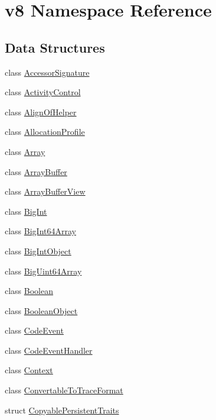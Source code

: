 \hypertarget{namespacev8}{}\section{v8 Namespace Reference}
\label{namespacev8}
\subsection*{Data Structures}
\begin{DoxyCompactItemize}
\item 
class \mbox{\hyperlink{classv8_1_1AccessorSignature}{Accessor\+Signature}}
\item 
class \mbox{\hyperlink{classv8_1_1ActivityControl}{Activity\+Control}}
\item 
class \mbox{\hyperlink{classv8_1_1AlignOfHelper}{Align\+Of\+Helper}}
\item 
class \mbox{\hyperlink{classv8_1_1AllocationProfile}{Allocation\+Profile}}
\item 
class \mbox{\hyperlink{classv8_1_1Array}{Array}}
\item 
class \mbox{\hyperlink{classv8_1_1ArrayBuffer}{Array\+Buffer}}
\item 
class \mbox{\hyperlink{classv8_1_1ArrayBufferView}{Array\+Buffer\+View}}
\item 
class \mbox{\hyperlink{classv8_1_1BigInt}{Big\+Int}}
\item 
class \mbox{\hyperlink{classv8_1_1BigInt64Array}{Big\+Int64\+Array}}
\item 
class \mbox{\hyperlink{classv8_1_1BigIntObject}{Big\+Int\+Object}}
\item 
class \mbox{\hyperlink{classv8_1_1BigUint64Array}{Big\+Uint64\+Array}}
\item 
class \mbox{\hyperlink{classv8_1_1Boolean}{Boolean}}
\item 
class \mbox{\hyperlink{classv8_1_1BooleanObject}{Boolean\+Object}}
\item 
class \mbox{\hyperlink{classv8_1_1CodeEvent}{Code\+Event}}
\item 
class \mbox{\hyperlink{classv8_1_1CodeEventHandler}{Code\+Event\+Handler}}
\item 
class \mbox{\hyperlink{classv8_1_1Context}{Context}}
\item 
class \mbox{\hyperlink{classv8_1_1ConvertableToTraceFormat}{Convertable\+To\+Trace\+Format}}
\item 
struct \mbox{\hyperlink{structv8_1_1CopyablePersistentTraits}{Copyable\+Persistent\+Traits}}
\item 

\end{DoxyCompactItemize}

